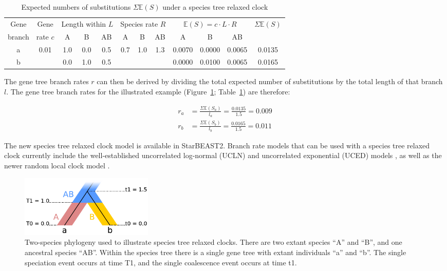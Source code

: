 \documentclass[12pt]{article}
\begin{document}
\begin{table}[htb!]
\caption{Expected numbers of substitutions $\Sigma \mathbb{E}(S)$ under a species tree relaxed clock}
\label{tab:branchRateModel}
\begin{threeparttable}
\begin{tabular*}{\textwidth}{@{\extracolsep{\fill}}cccccccccccc@{}}
\hline
Gene & Gene & \multicolumn{3}{c}{Length within $L$} & \multicolumn{3}{c}{Species rate $R$} & \multicolumn{3}{c}{$\mathbb{E}(S) = c\cdot L\cdot R$} & \multirow{2}{*}{$\Sigma \mathbb{E}(S)$}\tabularnewline
branch & rate $c$ & A & B & AB & A & B & AB & A & B & AB & \tabularnewline
\hline
a & \multirow{2}{*}{0.01} & 1.0 & 0.0 & 0.5 & \multirow{2}{*}{0.7} & \multirow{2}{*}{1.0} & \multirow{2}{*}{1.3} & 0.0070 & 0.0000 & 0.0065 & 0.0135\tabularnewline
b & & 0.0 & 1.0 & 0.5 & & & & 0.0000 & 0.0100 & 0.0065 & 0.0165\tabularnewline
\hline
\end{tabular*}
\end{threeparttable}
\end{table}

The gene tree branch rates $r$ can then be derived by dividing the total
expected number of substitutions by the total length of that branch $l$. The
gene tree branch rates for the illustrated example
(Figure~\ref{fig:branchRateModel}; Table~\ref{tab:branchRateModel}) are
therefore:

\begin{align}
r_a &= \frac{\Sigma \mathbb{E}(S_a)}{l_a} = \frac{0.0135}{1.5} = 0.009\\
r_b &= \frac{\Sigma \mathbb{E}(S_b)}{l_b} = \frac{0.0165}{1.5} = 0.011
\end{align}

The new species tree relaxed clock model is available in StarBEAST2. Branch rate
models that can be used with a species tree relaxed clock currently include the
well-established uncorrelated log-normal (UCLN) and uncorrelated exponential
(UCED) models \citep{10.1371/journal.pbio.0040088}, as well as the newer random
local clock model \citep{Drummond2010}.

\begin{figure}[htb!]
\centering
\includegraphics[width=2.5in]{relaxed_clock.pdf}
\caption
{Two-species phylogeny used to illustrate species tree relaxed
clocks. There are two extant species ``A'' and ``B'', and one ancestral species ``AB''.
Within the species tree there is a single gene tree with extant individuals ``a''
and ``b''. The single speciation event occurs at time T1, and the single coalescence
event occurs at time t1.}
\label{fig:branchRateModel}
\end{figure}
\end{document}
